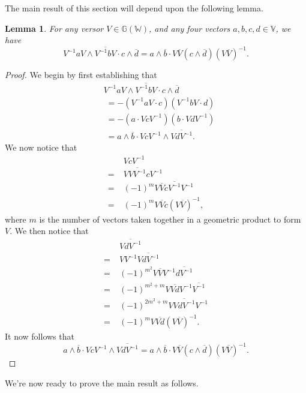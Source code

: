 \documentclass{birkjour}
\newtheorem{lem}[thm]{Lemma}
\theoremstyle{definition}
\theoremstyle{remark}
\numberwithin{equation}{section}
\newcommand{\G}{\mathbb{G}}
\newcommand{\V}{\mathbb{V}}
\newcommand{\W}{\mathbb{W}}
\begin{document}
The main result of this section will depend upon the following lemma.
\begin{lem}\label{lma_versor_transfer}
For any versor $V\in\G(\W)$, and any four vectors $a,b,c,d\in\V$, we have
\begin{equation}
V^{-1}aV\wedge\overline{V^{-1}bV}\cdot c\wedge\overline{d} =
a\wedge\overline{b}\cdot V\overline{V}(c\wedge\overline{d})(V\overline{V})^{-1}.
\end{equation}
\end{lem}
\begin{proof}
We begin by first establishing that
\begin{align}
 & V^{-1}aV\wedge\overline{V^{-1}bV}\cdot c\wedge\overline{d} \\
&\;= -(V^{-1}aV\cdot c)(V^{-1}bV\cdot d) \\
&\;= -(a\cdot VcV^{-1})(b\cdot VdV^{-1}) \\
&\;= a\wedge\overline{b}\cdot VcV^{-1}\wedge\overline{VdV^{-1}}.
\end{align}
We now notice that
\begin{align}
& VcV^{-1} \\
=\;& V\overline{VV^{-1}}cV^{-1} \\
=\;& (-1)^m V\overline{V}c\overline{V^{-1}}V^{-1} \\
=\;& (-1)^m V\overline{V}c(V\overline{V})^{-1},
\end{align}
where $m$ is the number of vectors taken together in a geometric
product to form $V$.  We then notice that
\begin{align}
& \overline{VdV^{-1}} \\
=\;& VV^{-1}\overline{VdV^{-1}} \\
=\;& (-1)^{m^2}V\overline{V}V^{-1}\overline{dV^{-1}} \\
=\;&(-1)^{m^2+m}V\overline{Vd}V^{-1}\overline{V^{-1}} \\
=\;&(-1)^{2m^2+m}V\overline{VdV^{-1}}V^{-1} \\
=\;&(-1)^mV\overline{Vd}(V\overline{V})^{-1}.
\end{align}
It now follows that
\begin{equation}
a\wedge\overline{b}\cdot VcV^{-1}\wedge\overline{VdV^{-1}} =
a\wedge\overline{b}\cdot V\overline{V}(c\wedge\overline{d})(V\overline{V})^{-1}.
\end{equation}
\end{proof}
We're now ready to prove the main result as follows.
\end{document}
